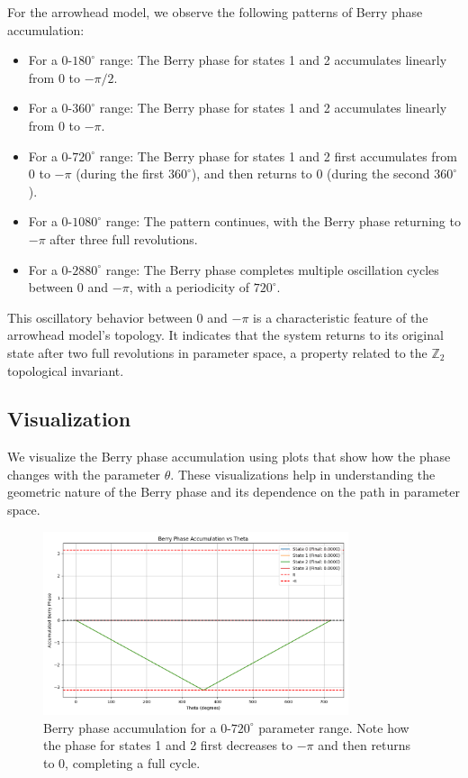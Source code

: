 \documentclass[12pt,a4paper]{article}
\begin{document}
For the arrowhead model, we observe the following patterns of Berry phase accumulation:

\begin{itemize}
    \item For a $0$-$180^{\circ}$ range: The Berry phase for states 1 and 2 accumulates linearly from 0 to $-\pi/2$.
    \item For a $0$-$360^{\circ}$ range: The Berry phase for states 1 and 2 accumulates linearly from 0 to $-\pi$.
    \item For a $0$-$720^{\circ}$ range: The Berry phase for states 1 and 2 first accumulates from 0 to $-\pi$ (during the first $360^{\circ}$), and then returns to 0 (during the second $360^{\circ}$).
    \item For a $0$-$1080^{\circ}$ range: The pattern continues, with the Berry phase returning to $-\pi$ after three full revolutions.
    \item For a $0$-$2880^{\circ}$ range: The Berry phase completes multiple oscillation cycles between 0 and $-\pi$, with a periodicity of $720^{\circ}$.
\end{itemize}

This oscillatory behavior between 0 and $-\pi$ is a characteristic feature of the arrowhead model's topology. It indicates that the system returns to its original state after two full revolutions in parameter space, a property related to the $\mathbb{Z}_2$ topological invariant.

\subsection{Visualization}

We visualize the Berry phase accumulation using plots that show how the phase changes with the parameter $\theta$. These visualizations help in understanding the geometric nature of the Berry phase and its dependence on the path in parameter space.

\begin{figure}[H]
    \centering
    \includegraphics[width=0.8\textwidth]{improved_berry_phase_results_theta_0_720_1000/berry_phase_vs_theta.png}
    \caption{Berry phase accumulation for a $0$-$720^{\circ}$ parameter range. Note how the phase for states 1 and 2 first decreases to $-\pi$ and then returns to 0, completing a full cycle.}
    \label{fig:berry_phase_720}
\end{figure}
\end{document}
